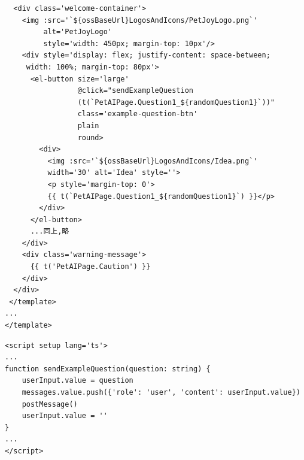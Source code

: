 \begin{itemize}
\begin{verbatim}
  <div class='welcome-container'>
    <img :src='`${ossBaseUrl}LogosAndIcons/PetJoyLogo.png`'
         alt='PetJoyLogo'
         style='width: 450px; margin-top: 10px'/>
    <div style='display: flex; justify-content: space-between;
     width: 100%; margin-top: 80px'>
      <el-button size='large'
                 @click="sendExampleQuestion
                 (t(`PetAIPage.Question1_${randomQuestion1}`))"
                 class='example-question-btn'
                 plain
                 round>
        <div>
          <img :src='`${ossBaseUrl}LogosAndIcons/Idea.png`' 
          width='30' alt='Idea' style=''>
          <p style='margin-top: 0'>
          {{ t(`PetAIPage.Question1_${randomQuestion1}`) }}</p>
        </div>
      </el-button>
      ...同上,略
    </div>
    <div class='warning-message'>
      {{ t('PetAIPage.Caution') }}
    </div>
  </div>
 </template>
...
</template>
	\end{verbatim}
	\begin{verbatim}
<script setup lang='ts'>
...
function sendExampleQuestion(question: string) {
	userInput.value = question
	messages.value.push({'role': 'user', 'content': userInput.value})
	postMessage()
	userInput.value = ''
}
...
</script>
	\end{verbatim}
\end{itemize}

